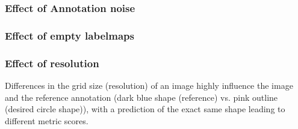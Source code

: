 \documentclass[11pt]{article}
\begin{document}
\subsubsection{Effect of Annotation noise}

\begin{figure}[H]
    \centering
\end{figure}

\subsubsection{Effect of empty labelmaps}

\begin{figure}[H]
    \centering
\end{figure}

\subsubsection{Effect of resolution}

Differences in the grid size (resolution) of an image highly influence the image and the reference annotation (dark blue shape (reference) vs. pink outline (desired circle shape)), with a prediction of the exact same shape leading to different metric scores.
\end{document}
